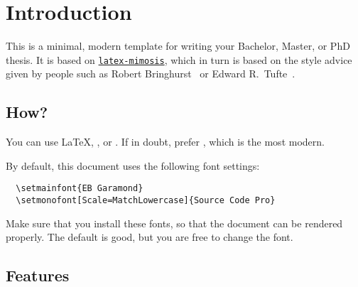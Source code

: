 \chapter{Introduction}

This is a minimal, modern template for writing your Bachelor, Master, or PhD thesis. It is based on \href{https://github.com/Pseudomanifold/latex-mimosis}{\texttt{latex-mimosis}}, which in turn is based on the style advice given by people such as Robert
Bringhurst~\cite{Bringhurst12} or Edward R.\
Tufte~\cite{Tufte90,Tufte01}.

\section{How?}

You can use \LaTeX, \XeLaTeX, or \LuaLaTeX. If in doubt, prefer \LuaLaTeX, which is the most modern.

By default, this document uses the following font settings:
\begin{verbatim}
  \setmainfont{EB Garamond}
  \setmonofont[Scale=MatchLowercase]{Source Code Pro}
\end{verbatim}
Make sure that you install these fonts, so that the document can be rendered properly. The default is good, but you are free to change the font.

\section{Features}

